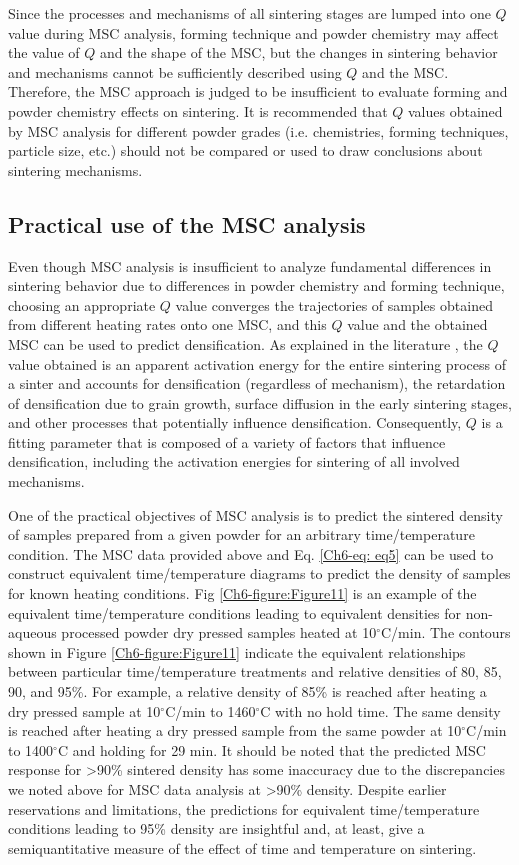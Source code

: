 Since the processes and mechanisms of all sintering stages are lumped into one $Q$ value during MSC analysis, forming technique and powder chemistry may affect the value of $Q$ and the shape of the MSC, but the changes in sintering behavior and mechanisms cannot be sufficiently described using $Q$ and the MSC. Therefore, the MSC approach is judged to be insufficient to evaluate forming and powder chemistry effects on sintering. It is recommended that $Q$ values obtained by MSC analysis for different powder grades (i.e. chemistries, forming techniques, particle size, etc.) should not be compared or used to draw conclusions about sintering mechanisms.

\subsection{Practical use of the MSC analysis}
Even though MSC analysis is insufficient to analyze fundamental differences in sintering behavior due to differences in powder chemistry and forming technique, choosing an appropriate $Q$ value converges the trajectories of samples obtained from different heating rates onto one MSC, and this $Q$ value and the obtained MSC can be used to predict densification. As explained in the literature \cite{Wang2010,Reiterer2009}, the $Q$ value obtained is an apparent activation energy for the entire sintering process of a sinter and accounts for densification (regardless of mechanism), the retardation of densification due to grain growth, surface diffusion in the early sintering stages, and other processes that potentially influence densification. Consequently, $Q$ is a fitting parameter that is composed of a variety of factors that influence densification, including the activation energies for sintering of all involved mechanisms. 

One of the practical objectives of MSC analysis is to predict the sintered density of samples prepared from a given powder for an arbitrary time/temperature condition. The MSC data provided above and Eq. \ref{Ch6-eq: eq5} can be used to construct equivalent time/temperature diagrams to predict the density of samples for known heating conditions. Fig \ref{Ch6-figure:Figure11} is an example of the equivalent time/temperature conditions leading to equivalent densities for non-aqueous processed powder dry pressed samples heated at 10$^{\circ}$C/min. The contours shown in Figure \ref{Ch6-figure:Figure11} indicate the equivalent relationships between particular time/temperature treatments and relative densities of 80, 85, 90, and 95\%. For example, a relative density of 85\% is reached after heating a dry pressed sample at 10$^{\circ}$C/min to 1460$^{\circ}$C with no hold time. The same density is reached after heating a dry pressed sample from the same powder at 10$^{\circ}$C/min to 1400$^{\circ}$C and holding for 29 min. It should be noted that the predicted MSC response for >90\% sintered density has some inaccuracy due to the discrepancies we noted above for MSC data analysis at >90\% density. Despite earlier reservations and limitations, the predictions for equivalent time/temperature conditions leading to 95\% density are insightful and, at least, give a semiquantitative measure of the effect of time and temperature on sintering.


